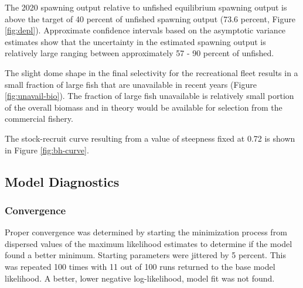 \documentclass[11pt,
  english,
  a4paper,
]{article}
\begin{document}

The 2020 spawning output relative to unfished equilibrium spawning output is above the target of 40 percent of unfished spawning output (73.6 percent, Figure \ref{fig:depl}). Approximate confidence intervals based on the asymptotic variance estimates show that the uncertainty in the estimated spawning output is relatively large ranging between approximately 57 - 90 percent of unfished.

\leavevmode\tagmcend\tagstructend\par


The slight dome shape in the final selectivity for the recreational fleet results in a small fraction of large fish that are unavailable in recent years (Figure \ref{fig:unavail-bio}). The fraction of large fish unavailable is relatively small portion of the overall biomass and in theory would be available for selection from the commercial fishery.

\leavevmode\tagmcend\tagstructend\par


The stock-recruit curve resulting from a value of steepness fixed at 0.72 is shown in Figure \ref{fig:bh-curve}.

\leavevmode\tagmcend\tagstructend\par


\hypertarget{model-diagnostics}{%
\subsection{Model Diagnostics}\label{model-diagnostics}}

\leavevmode\tagmcend\tagstructend


\hypertarget{convergence}{%
\subsubsection{Convergence}\label{convergence}}

\leavevmode\tagmcend\tagstructend


Proper convergence was determined by starting the minimization process from dispersed values of the maximum likelihood estimates to determine if the model found a better minimum. Starting parameters were jittered by 5 percent. This was repeated 100 times with 11 out of 100 runs returned to the base model likelihood. A better, lower negative log-likelihood, model fit was not found.
\end{document}
